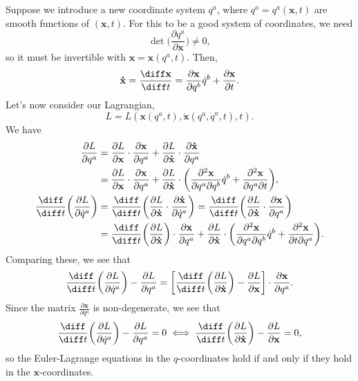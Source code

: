 \documentclass[12pt]{article}
\begin{document}
Suppose we introduce a new coordinate system $q^{a}$, where $q^{a} = q^{a}(\mathbf{x}, t)$ are smooth functions of $(\mathbf{x}, t)$. For this to be a good system of coordinates, we need
\[
\det \biggl( \frac{\partial q^{a}}{\partial \mathbf{x}} \biggr) \neq 0,
\]
so it must be invertible with $\mathbf{x} = \mathbf{x}(q^a, t)$. Then,
\[
\mathbf{\dot x} = \frac{\diff \mathbf{x}}{\diff t} = \frac{\partial \mathbf{x}}{\partial q^b} \dot q^b + \frac{\partial \mathbf{x}}{\partial t}.
\]
Let's now consider our Lagrangian,
\[
L = L(\mathbf{x}(q^a, t), \mathbf{\dot x}(q^a, \dot q^a, t), t).
\]
We have
\begin{align*}
	\frac{\partial L}{\partial q^{a}} &= \frac{\partial L}{\partial \mathbf{x}} \cdot \frac{\partial \mathbf{x}}{\partial q^{a}} + \frac{\partial L}{\partial \mathbf{\dot x}} \cdot \frac{\partial \mathbf{\dot x}}{\partial q^{a}} \\
					  &= \frac{\partial L}{\partial \mathbf{x}} \cdot \frac{\partial \mathbf{x}}{\partial q^a} + \frac{\partial L}{\partial \mathbf{\dot x}} \cdot \biggl( \frac{\partial^2 \mathbf{x}}{\partial q^{a} \partial q^b} \dot q^b + \frac{\partial^2 \mathbf{x}}{\partial q^a \partial t} \biggr), \\
	\frac{\diff}{\diff t} \biggl( \frac{\partial L}{\partial \dot q^a} \biggr) &= \frac{\diff}{\diff t} \biggl( \frac{\partial L}{\partial \mathbf{\dot x}} \cdot \frac{\partial \mathbf{\dot x}}{\partial \dot q^a} \biggr) = \frac{\diff}{\diff t} \biggl( \frac{\partial L}{\partial \mathbf{\dot x}} \cdot \frac{\partial \mathbf{x}}{\partial q^a} \biggr) \\
										   &= \frac{\diff}{\diff t} \biggl( \frac{\partial L}{\partial \mathbf{\dot x}} \biggr) \cdot \frac{\partial \mathbf{x}}{\partial q^a} + \frac{\partial L}{\partial \mathbf{\dot x}} \cdot \biggl( \frac{\partial^2 \mathbf{x}}{\partial q^a \partial q^b} \dot q^b + \frac{\partial^2 \mathbf{x}}{\partial t \partial q^a} \biggr).
\end{align*}
Comparing these, we see that
\[
	\frac{\diff}{\diff t} \biggl( \frac{\partial L}{\partial \dot q^a} \biggr) - \frac{\partial L}{\partial q^a} = \biggl[ \frac{\diff}{\diff t} \biggl( \frac{\partial L}{\partial \mathbf{\dot x}} \biggr) - \frac{\partial L}{\partial \mathbf{x}} \biggr] \cdot \frac{\partial \mathbf{x}}{\partial q^a}.
\]
Since the matrix $\frac{\partial \mathbf{x}}{\partial q^a}$ is non-degenerate, we see that
\[
\frac{\diff}{\diff t} \biggl( \frac{\partial L}{\partial \dot q^a} \biggr) - \frac{\partial L}{\partial q^a} = 0 \iff \frac{\diff}{\diff t} \biggl( \frac{\partial L}{\partial \mathbf{\dot x}} \biggr) - \frac{\partial L}{\partial \mathbf{x}} = 0,
\]
so the Euler-Lagrange equations in the $q$-coordinates hold if and only if they hold in the $\mathbf{x}$-coordinates.
\end{document}
